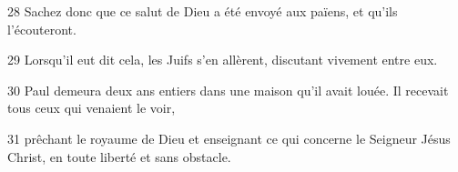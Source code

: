 \par 28 Sachez donc que ce salut de Dieu a été envoyé aux païens, et qu'ils l'écouteront.
\par 29 Lorsqu'il eut dit cela, les Juifs s'en allèrent, discutant vivement entre eux.
\par 30 Paul demeura deux ans entiers dans une maison qu'il avait louée. Il recevait tous ceux qui venaient le voir,
\par 31 prêchant le royaume de Dieu et enseignant ce qui concerne le Seigneur Jésus Christ, en toute liberté et sans obstacle.


